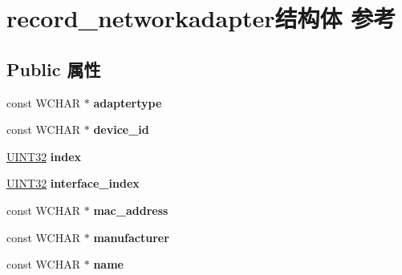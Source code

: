 \hypertarget{structrecord__networkadapter}{}\section{record\+\_\+networkadapter结构体 参考}
\label{structrecord__networkadapter}
\subsection*{Public 属性}
\begin{DoxyCompactItemize}
\item 
\mbox{\label{structrecord__networkadapter_a327a9ab58748f7b8b35582d53ac826df}} 
const W\+C\+H\+AR $\ast$ {\bfseries adaptertype}
\item 
\mbox{\label{structrecord__networkadapter_a1c86016ae5d6af309040dbf35e0cc304}} 
const W\+C\+H\+AR $\ast$ {\bfseries device\+\_\+id}
\item 
\mbox{\label{structrecord__networkadapter_a16e2536d8837f7a712e40dd90358f4e0}} 
\hyperlink{_processor_bind_8h_ae1e6edbbc26d6fbc71a90190d0266018}{U\+I\+N\+T32} {\bfseries index}
\item 
\mbox{\label{structrecord__networkadapter_a9cea85281b5a81f010a2fcc52fef38b3}} 
\hyperlink{_processor_bind_8h_ae1e6edbbc26d6fbc71a90190d0266018}{U\+I\+N\+T32} {\bfseries interface\+\_\+index}
\item 
\mbox{\label{structrecord__networkadapter_a064cc37cce6cd7d9c8e170e4fff1f2a3}} 
const W\+C\+H\+AR $\ast$ {\bfseries mac\+\_\+address}
\item 
\mbox{\label{structrecord__networkadapter_ab28975c0fa78cd2d1290d210c51b1a39}} 
const W\+C\+H\+AR $\ast$ {\bfseries manufacturer}
\item 
\mbox{\label{structrecord__networkadapter_a16dbb2f54c3353b6660e1b61c94062cb}} 
const W\+C\+H\+AR $\ast$ {\bfseries name}
\item 
\mbox{\label{structrecord__networkadapter_a78751c68350ad56036dc6be96f27afdf}} 

\end{DoxyCompactItemize}
